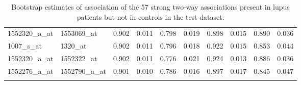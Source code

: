 \documentclass[a4paper, 12pt]{report}
\begin{document}
\begin{footnotesize}
\begin{longtable}{ | >{}m{2cm}| >{}m{2cm} | >{}m{0.8cm}| >{}m{0.8cm} |>{}m{0.8cm}| >{}m{0.8cm} |>{}m{0.8cm}| >{}m{0.8cm} |>{}m{0.8cm}| >{}m{0.8cm} |}
  1552320\_a\_at & 1553069\_at & 0.902 & 0.011 & 0.798 & 0.019 & 0.898 & 0.015 & 0.890 & 0.036 \\ 
  1007\_s\_at & 1320\_at & 0.902 & 0.011 & 0.796 & 0.018 & 0.922 & 0.015 & 0.853 & 0.044 \\ 
  1552320\_a\_at & 1552322\_at & 0.902 & 0.011 & 0.776 & 0.021 & 0.924 & 0.013 & 0.886 & 0.036 \\ 
  1552276\_a\_at & 1552790\_a\_at & 0.901 & 0.010 & 0.786 & 0.016 & 0.897 & 0.017 & 0.845 & 0.047 \\ 
   \hline
\caption{Bootstrap estimates of association of the 57 strong two-way associations present  in lupus patients but not in controls in the test dataset.} 
\label{T:bigAE}
\end{longtable}
\end{footnotesize}


%
\end{document}
